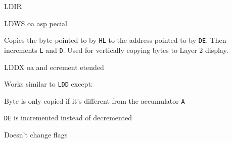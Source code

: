\begin{basedescript}{
	\desclabelstyle{\multilinelabel}
	\desclabelwidth{3cm}}
\begin{DetailItem}{LDIR}
	\end{DetailItem}


	\label{DetailRefLDWS}
	\begin{DetailItem}{LDWS\ZXN}
		{oa asp pecial}
		{\SymLDWS}

		Copies the byte pointed to by {\tt HL} to the address pointed to by {\tt DE}. Then increments {\tt L} and {\tt D}. Used for vertically copying bytes to Layer 2 display.
			
		\begin{DetailEffects}[v]
			\FlagsLDWS
		\end{DetailEffects}
				
		\begin{DetailTiming}
		\end{DetailTiming}



	\end{DetailItem}

	\label{DetailRefLDDX}
	\begin{DetailItem}{LDDX\ZXN}
		{oa\IH{D} and ecrement etended}		
		{\SymLDDX}

		Works similar to {\tt LDD} except:
		\begin{DetailCompactList}
			\item Byte is only copied if it's different from the accumulator {\tt A}
			\item {\tt DE} is incremented instead of decremented
			\item Doesn't change flags
		\end{DetailCompactList}

		\begin{DetailEffects}
			\FlagsLDDX
		\end{DetailEffects}
				

\end{DetailItem}
\end{basedescript}
